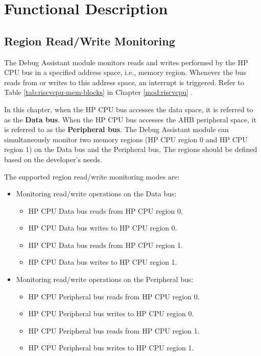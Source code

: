 \documentclass[main\_\_EN.tex]{subfiles}
\begin{document}
\section{Functional Description}
\label{sec:dbgassist-func-descr}

\subsection{Region Read/Write Monitoring}

The Debug Assistant module monitors reads and writes performed by the HP CPU bus in a specified address space, i.e., memory region. Whenever the bus reads from or writes to this address space, an interrupt is triggered. Refer to Table \ref{tab:riscvcpu-mem-blocks} in Chapter \ref{mod:riscvcpu} \textit{}.

In this chapter, when the HP CPU bus accesses the data space, it is referred to as the \textbf{Data bus}. When the HP CPU bus accesses the AHB peripheral space, it is referred to as the \textbf{Peripheral bus}. The Debug Assistant module can simultaneously monitor two memory regions (HP CPU region 0 and HP CPU region 1) on the Data bus and the Peripheral bus. The regions should be defined based on the developer's needs. 

The supported region read/write monitoring modes are:

\begin{itemize}
    \item Monitoring read/write operations on the Data bus:
        \begin{itemize}
            \item HP CPU Data bus reads from HP CPU region 0.
            \item HP CPU Data bus writes to HP CPU region 0.
            \item HP CPU Data bus reads from HP CPU region 1.
            \item HP CPU Data bus writes to HP CPU region 1.
        \end{itemize}    
    \item Monitoring read/write operations on the Peripheral bus:
        \begin{itemize}
            \item HP CPU Peripheral bus reads from HP CPU region 0.
            \item HP CPU Peripheral bus writes to HP CPU region 0.
            \item HP CPU Peripheral bus reads from HP CPU region 1.
            \item HP CPU Peripheral bus writes to HP CPU region 1.
        \end{itemize}
\end{itemize}
\end{document}
